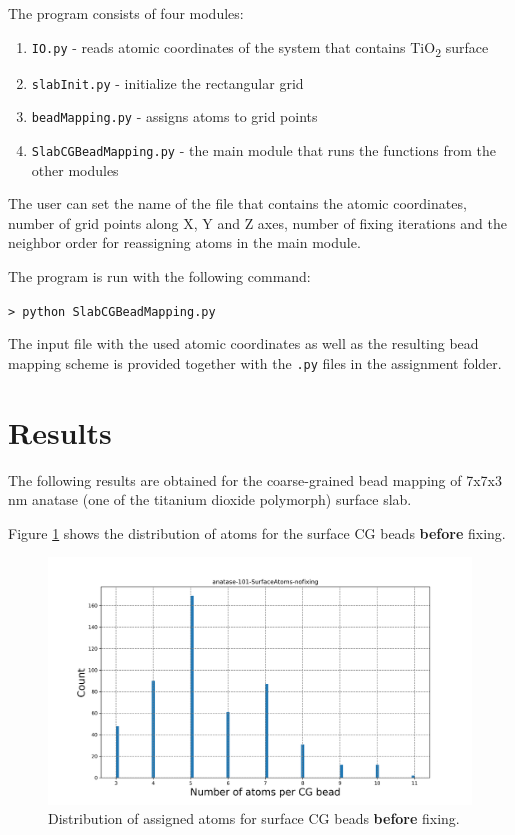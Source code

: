 \documentclass[11pt]{article}
\begin{document}
The program consists of four modules:

\begin{enumerate}
\item \texttt{IO.py} - reads atomic coordinates of the system that contains TiO\textsubscript{2} surface
\item \texttt{slabInit.py} - initialize the rectangular grid
\item \texttt{beadMapping.py} - assigns atoms to grid points
\item \texttt{SlabCGBeadMapping.py} - the main module that runs the functions from the other modules
\end{enumerate}

The user can set the name of the file that contains the atomic coordinates, number of grid points along X, Y and Z axes, number of fixing iterations and the neighbor order for reassigning atoms in the main module. 

The program is run with the following command:

\texttt{> python SlabCGBeadMapping.py}

The input file with the used atomic coordinates as well as the resulting bead mapping scheme is provided together with the \texttt{.py} files in the assignment folder.

\section{Results}

The following results are obtained for the coarse-grained bead mapping of 7x7x3 nm anatase (one of the titanium dioxide polymorph) surface slab.

Figure \ref{fig: anatase-101 histogram unfixed} shows the distribution of atoms for the surface CG beads \textbf{before} fixing.

\begin{figure}[h]
\centering
\includegraphics[scale=0.3]{anatase-101-SurfaceAtoms-nofixing.png}
\caption{Distribution of assigned atoms for surface CG beads \textbf{before} fixing.}
\label{fig: anatase-101 histogram unfixed}
\end{figure}
\end{document}
